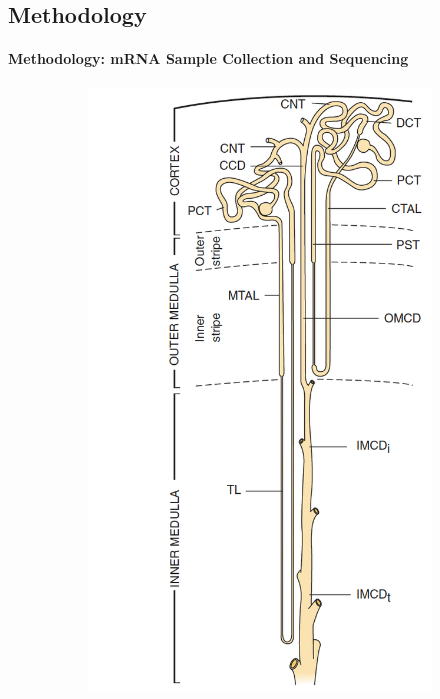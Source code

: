 \documentclass[
11pt,notheorems,hyperref={pdfauthor=whatever}
]{beamer}
\begin{document}
\subsection{Methodology}
\begin{frame}
    \framesubtitle{Methodology: mRNA Sample Collection and Sequencing}
    \begin{figure}
        \centering
        \begin{subfigure}[b]{0.3\textwidth}
            \centering
            \includegraphics[scale=0.39]{AldoFruc_CortexCollection.jpg}

\end{subfigure}
\end{figure}
\end{frame}
\end{document}
